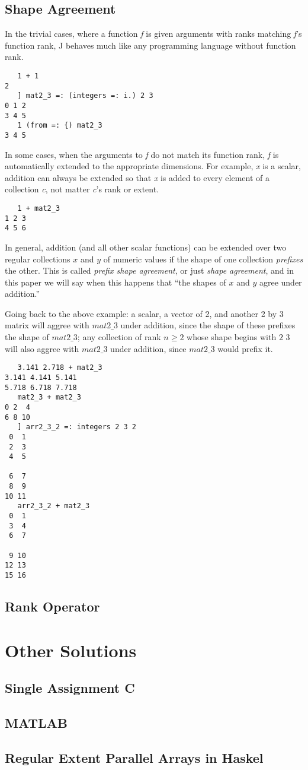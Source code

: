\subsection{Shape Agreement}
In the trivial cases, where a function \textit{f} is given arguments with ranks matching \textit{f}'s function rank, J behaves much like any programming language without function rank.
\begin{verbatim}
   1 + 1
2
   ] mat2_3 =: (integers =: i.) 2 3
0 1 2
3 4 5
   1 (from =: {) mat2_3
3 4 5
\end{verbatim}

In some cases, when the arguments to \textit{f} do not match its function rank, \textit{f} is automatically extended to the appropriate dimensions.
For example, \textit{x} is a scalar, addition can always be extended so that \textit{x} is added to every element of a collection \textit{c}, not matter \textit{c}'s rank or extent. %
\begin{verbatim}
   1 + mat2_3
1 2 3
4 5 6
\end{verbatim}

In general, addition (and all other scalar functions) can be extended over two regular collections $x$ and $y$ of numeric values if the shape of one collection \textit{prefixes} the other.
This is called \textit{prefix shape agreement}, or just \textit{shape agreement},\cite{rankanduni} 
and in this paper we will say when this happens that ``the shapes of $x$ and $y$ agree under addition.''

Going back to the above example: a scalar, a vector of 2, and another 2 by 3 matrix will aggree with $mat2\_3$ under addition, since the shape of these prefixes the shape of $mat2\_3$; 
any collection of rank $n \ge 2$ whose shape begins with $2$ $3$ will also aggree with $mat2\_3$ under addition, since $mat2\_3$ would prefix it.

\begin{verbatim}
   3.141 2.718 + mat2_3
3.141 4.141 5.141
5.718 6.718 7.718
   mat2_3 + mat2_3
0 2  4
6 8 10
   ] arr2_3_2 =: integers 2 3 2
 0  1
 2  3
 4  5

 6  7
 8  9
10 11
   arr2_3_2 + mat2_3
 0  1
 3  4
 6  7

 9 10
12 13
15 16
\end{verbatim}

\subsection{Rank Operator}


\section{Other Solutions}
\subsection{Single Assignment C}

\subsection{MATLAB}

\subsection{Regular Extent Parallel Arrays in Haskel}
